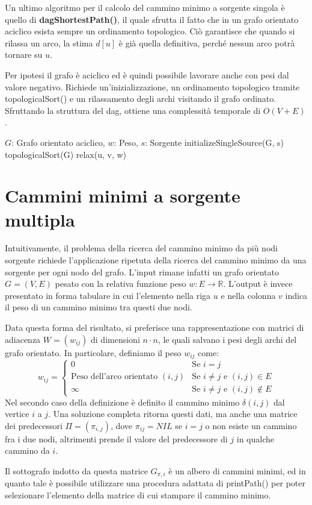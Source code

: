 \noindent Un ultimo algoritmo per il calcolo del cammino minimo a sorgente singola è quello di \textbf{dagShortestPath()}, il quale sfrutta il fatto
che in un grafo orientato aciclico esista sempre un ordinamento topologico. Ciò garantisce che quando si rilassa un arco, la stima $d[u]$ è già quella
definitiva, perché nessun arco potrà tornare su $u$.\par
Per ipotesi il grafo è aciclico ed è quindi possibile lavorare anche con pesi dal valore negativo. Richiede un'inizializzazione, un ordinamento
topologico tramite topologicalSort() e un rilassamento degli archi visitando il grafo ordinato. Sfruttando la struttura del dag, ottiene una complessità
temporale di $O(V+E)$.
\begin{algorithm}[h]
	\caption{dagShortestPath(G, w, s)}
	\begin{algorithmic}[i]
		\Require $G$: Grafo orientato aciclico, $w$: Peso, $s$: Sorgente
		\State initializeSingleSource(G, s)
		\State topologicalSort(G)
		\State
		\State relax(u, v, w)
		\EndFor
		\EndFor
	\end{algorithmic}
\end{algorithm}

%

\section{Cammini minimi a sorgente multipla}
Intuitivamente, il problema della ricerca del cammino minimo da più nodi sorgente richiede l'applicazione ripetuta della ricerca del cammino minimo da
una sorgente per ogni nodo del grafo. L'input rimane infatti un grafo orientato $G = (V, E)$ pesato con la relativa funzione peso $w:E\to\mathbb{R}$.
L'output è invece presentato in forma tabulare in cui l'elemento nella riga $u$ e nella colonna $v$ indica il peso di un cammino minimo tra questi due
nodi.\par
Data questa forma del risultato, si preferisce una rappresentazione con matrici di adiacenza $W = (w_{ij})$ di dimensioni $n\cdot n$, le quali salvano
i pesi degli archi del grafo orientato. In particolare, definiamo il peso $w_{ij}$ come: \[
	w_{ij} = \begin{cases}
		0 & \text{Se $i=j$}\\
		\text{Peso dell'arco orientato $(i,j)$} & \text{Se $i\neq j$ e $(i,j)\in E$}\\
		\infty & \text{Se $i\neq j$ e $(i,j)\notin E$}
	\end{cases}
\]
\noindent Nel secondo caso della definizione è definito il cammino minimo $\delta(i, j)$ dal vertice $i$ a $j$. Una soluzione completa ritorna questi
dati, ma anche una matrice dei predecessori $\Pi = (\pi_{i,j})$, dove $\pi_{ij}=NIL$ se $i=j$ o non esiste un cammino fra i due nodi, altrimenti prende
il valore del predecessore di $j$ in qualche cammino da $i$.\par
Il sottografo indotto da questa matrice $G_{\pi, i}$ è un albero di cammini minimi, ed in quanto tale è possibile utilizzare una procedura adattata di
printPath() per poter selezionare l'elemento della matrice di cui stampare il cammino minimo.\newline

